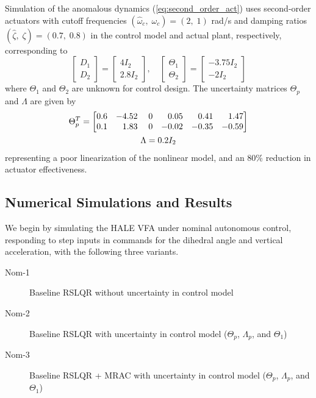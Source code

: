 Simulation of the anomalous dynamics (\ref{eq:second_order_act}) uses second-order actuators with cutoff frequencies $(\hat{\omega}_c,\; \omega_c) = (2 ,\; 1)$ rad/s and damping ratios $(\hat{\zeta},\; \zeta) = (0.7,\; 0.8)$ in the control model and actual plant, respectively, corresponding to
\begin{equation}
\begin{bmatrix}
	D_1 \\ D_2
\end{bmatrix} = \begin{bmatrix}
	4 I_2 \\ 2.8 I_2
\end{bmatrix}, \quad \begin{bmatrix}
	\Theta_1 \\ \Theta_2 
\end{bmatrix} = \begin{bmatrix}
	-3.75 I_2 \\ -2 I_2
\end{bmatrix}
\end{equation}
where $\Theta_1$ and $\Theta_2$ are unknown for control design. The uncertainty matrices $\Theta_p$ and $\Lambda$ are given by
\begin{equation}
\begin{gathered}
\Theta_{p}^{T}=\begin{bmatrix}
0.6 & -4.52 & \; 0 & \hfill 0.05 & \hfill 0.41 & \hfill 1.47\\
0.1 & \hfill 1.83 & \; 0 & -0.02 & -0.35 & -0.59
\end{bmatrix}\\ \Lambda = 0.2 I_2 \end{gathered}
\end{equation}
representing a poor linearization of the nonlinear model, and an 80\% reduction in actuator effectiveness.

\subsection{Numerical Simulations and Results} \label{subsec:sims}
We begin by simulating the HALE VFA under nominal autonomous control, responding to step inputs in commands for the dihedral angle and vertical acceleration, with the following three variants.
\begin{description}
	\item[Nom-1] Baseline RSLQR without uncertainty in control model
	\item[Nom-2] Baseline RSLQR with uncertainty in control model ($\Theta_p$, $\Lambda_p$, and $\Theta_1$)
	\item[Nom-3] Baseline RSLQR + MRAC with uncertainty in control model ($\Theta_p$, $\Lambda_p$, and $\Theta_1$)
\end{description}

